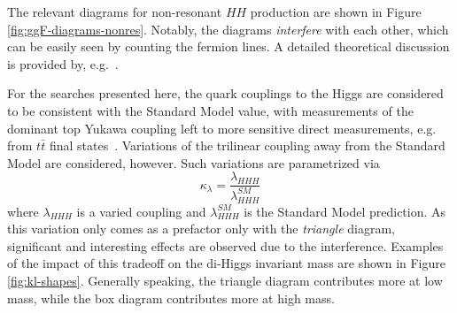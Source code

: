 The relevant diagrams for non-resonant $HH$ production are shown in Figure \ref{fig:ggF-diagrams-nonres}.
Notably, the diagrams \emph{interfere} with each other, which can be easily seen by counting the fermion lines. 
A detailed theoretical discussion is provided by, e.g.~\cite{Dawson-2015}.

For the searches presented here, the quark couplings to the Higgs are considered to be consistent with the Standard 
Model value, with measurements of the dominant top Yukawa coupling left to more sensitive direct measurements, e.g. from 
$t\bar{t}$ final states~\cite{top-Yukawa}. Variations of the trilinear coupling away from the Standard 
Model are considered, however. Such variations are parametrized via 
\begin{equation}
\kappa_{\lambda} = \frac{\lambda_{HHH}}{\lambda_{HHH}^{SM}}
\end{equation}
where $\lambda_{HHH}$ is a varied coupling and $\lambda_{HHH}^{SM}$ is the Standard Model prediction.
As this variation only comes as a prefactor only with the \emph{triangle} diagram, significant and interesting 
effects are observed due to the interference. Examples of the impact of this tradeoff on the di-Higgs invariant 
mass are shown in Figure \ref{fig:kl-shapes}. Generally speaking, the triangle diagram contributes more at low mass, 
while the box diagram contributes more at high mass. 

